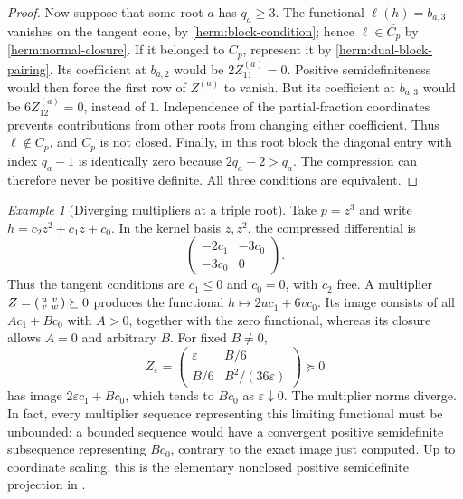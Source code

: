 \documentclass[reqno]{amsart}
\theoremstyle{definition}
\theoremstyle{remark}
\newtheorem{example}[theorem]{Example}
\begin{document}
\begin{proof}
Now suppose that some root $a$ has $q_a\geq3$.  The functional
$\ell(h)=b_{a,3}$ vanishes on the tangent cone, by
\eqref{herm:block-condition}; hence $\ell\in\overline{C_p}$ by
\eqref{herm:normal-closure}.  If it belonged to $C_p$, represent it by
\eqref{herm:dual-block-pairing}.  Its coefficient at $b_{a,2}$ would be
$2Z^{(a)}_{11}=0$.  Positive semidefiniteness would then force the first
row of $Z^{(a)}$ to vanish.  But its coefficient at $b_{a,3}$ would be
$6Z^{(a)}_{12}=0$, instead of $1$.  Independence of the partial-fraction
coordinates prevents contributions from other roots from changing
either coefficient.  Thus $\ell\notin C_p$, and $C_p$ is not closed.
Finally, in this root block the diagonal entry with index $q_a-1$ is
identically zero because $2q_a-2>q_a$.  The compression can therefore
never be positive definite.  All three conditions are equivalent.
\end{proof}

\begin{example}[Diverging multipliers at a triple root]
\label{herm:cubic-multiplier}
Take $p=z^3$ and write $h=c_2z^2+c_1z+c_0$.  In the kernel basis
$z,z^2$, the compressed differential is
\[
 \begin{pmatrix}-2c_1&-3c_0\\-3c_0&0\end{pmatrix}.
\]
Thus the tangent conditions are $c_1\leq0$ and $c_0=0$, with $c_2$
free.  A multiplier
$Z=\begin{psmallmatrix}u&v\\v&w\end{psmallmatrix}\succeq0$
produces the functional $h\mapsto2u c_1+6v c_0$.  Its image consists of
all $A c_1+B c_0$ with $A>0$, together with the zero functional, whereas
its closure allows $A=0$ and arbitrary $B$.  For fixed $B\ne0$,
\[
 Z_\varepsilon=
 \begin{pmatrix}
   \varepsilon&B/6\\
   B/6&B^2/(36\varepsilon)
 \end{pmatrix}\succeq0
\]
has image $2\varepsilon c_1+B c_0$, which tends to $B c_0$ as
$\varepsilon\downarrow0$.  The multiplier norms diverge.  In fact,
every multiplier sequence representing this limiting functional must
be unbounded: a bounded sequence would have a convergent positive
semidefinite subsequence representing $B c_0$, contrary to the exact
image just computed.  Up to coordinate scaling, this is the elementary
nonclosed positive semidefinite projection in
\cite[Example~1]{JiangSturmfels21}.
\end{example}
\end{document}
